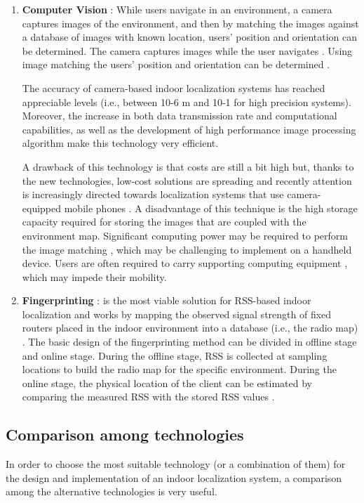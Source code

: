             \begin{enumerate}
				\item \textbf{Computer Vision} : While users navigate in an environment, a camera captures images of the environment, and then
by matching the images against a database of images with known location, users’ position and orientation can be determined. The camera captures images while the user navigates \cite{fallah2013indoor}. Using image matching the users’ position and orientation can be determined \cite{fallah2013indoor}. 

The accuracy of camera-based indoor localization systems has reached appreciable levels \cite{mautz2011survey} (i.e., between 10-6 m and 10-1 for high precision systems). Moreover, the increase in both data transmission rate and computational capabilities, as well as the development of high performance image processing algorithm make this technology very efficient. 

A drawback of this technology is that costs are still a bit high but, thanks to the new technologies, low-cost solutions are spreading and recently attention is increasingly directed towards localization systems that use camera-equipped mobile phones \cite{mautz2011survey}. A disadvantage of this technique is the high storage capacity required for storing the images that are coupled with the environment map. Significant computing power may be required to perform the image matching \cite{mautz2011survey}, which may be challenging to implement on a handheld device. Users are often required to carry supporting computing equipment \cite{mautz2011survey}, which may impede their mobility.

                \item \textbf{Fingerprinting} : is the most viable solution for RSS-based indoor localization and works by mapping the observed signal strength of fixed routers placed in the indoor environment into a database (i.e., the radio map) \cite{mainetti2014Indoorlit}. The basic design of the fingerprinting method can be divided in offline stage and online stage. During the offline stage, RSS is collected at sampling locations to build the radio map for the specific environment. During the online stage, the physical location of the client can be estimated by comparing the measured RSS with the stored RSS values \cite{mainetti2014Indoorlit}.
			\end{enumerate}
            
            \subsection{Comparison among technologies} %
            In order to choose the most suitable technology (or a combination of them) for the design and implementation of an indoor localization system, a comparison among the alternative technologies is very useful.
            
